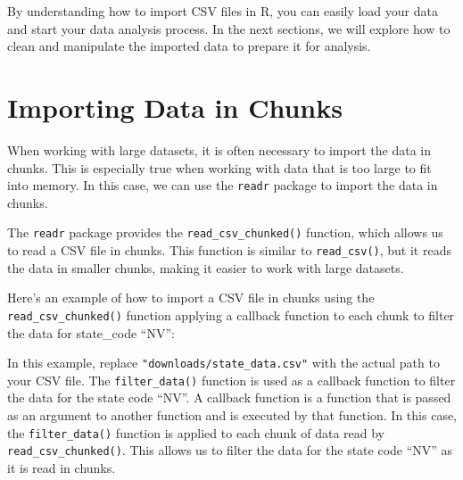 \documentclass[
]{book}
\newenvironment{Shaded}{\begin{snugshade}}{\end{snugshade}}
\newcommand{\AttributeTok}[1]{\textcolor[rgb]{0.13,0.29,0.53}{#1}}
\newcommand{\CommentTok}[1]{\textcolor[rgb]{0.56,0.35,0.01}{\textit{#1}}}
\newcommand{\ControlFlowTok}[1]{\textcolor[rgb]{0.13,0.29,0.53}{\textbf{#1}}}
\newcommand{\DecValTok}[1]{\textcolor[rgb]{0.00,0.00,0.81}{#1}}
\newcommand{\FunctionTok}[1]{\textcolor[rgb]{0.13,0.29,0.53}{\textbf{#1}}}
\newcommand{\NormalTok}[1]{#1}
\newcommand{\OtherTok}[1]{\textcolor[rgb]{0.56,0.35,0.01}{#1}}
\newcommand{\SpecialCharTok}[1]{\textcolor[rgb]{0.81,0.36,0.00}{\textbf{#1}}}
\newcommand{\StringTok}[1]{\textcolor[rgb]{0.31,0.60,0.02}{#1}}
\begin{document}
By understanding how to import CSV files in R, you can easily load your data and start your data analysis process. In the next sections, we will explore how to clean and manipulate the imported data to prepare it for analysis.

\newpage

\section{Importing Data in Chunks}\label{importing-data-in-chunks}

When working with large datasets, it is often necessary to import the data in chunks. This is especially true when working with data that is too large to fit into memory. In this case, we can use the \texttt{readr} package to import the data in chunks.

The \texttt{readr} package provides the \texttt{read\_csv\_chunked()} function, which allows us to read a CSV file in chunks. This function is similar to \texttt{read\_csv()}, but it reads the data in smaller chunks, making it easier to work with large datasets.

Here's an example of how to import a CSV file in chunks using the \texttt{read\_csv\_chunked()} function applying a callback function to each chunk to filter the data for state\_code ``NV'':

\begin{Shaded}
\end{Shaded}

In this example, replace \texttt{"downloads/state\_data.csv"} with the actual path to your CSV file. The \texttt{filter\_data()} function is used as a callback function to filter the data for the state code ``NV''. A callback function is a function that is passed as an argument to another function and is executed by that function. In this case, the \texttt{filter\_data()} function is applied to each chunk of data read by \texttt{read\_csv\_chunked()}. This allows us to filter the data for the state code ``NV'' as it is read in chunks.

  
\end{document}
